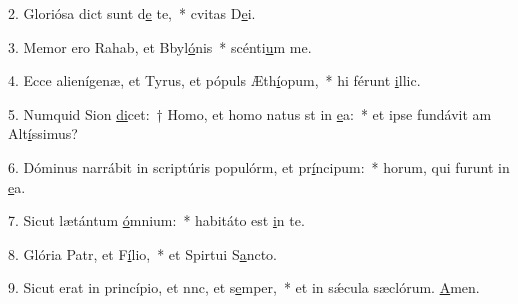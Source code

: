 2. Gloriósa dict sunt d\uline{e} te,~* cvitas D\uline{e}i.\par 
3. Memor ero Rahab, et Bbyl\uline{ó}nis~* scénti\uline{u}m me.\par 
4. Ecce alienígenæ, et Tyrus, et pópuls Æth\uline{í}opum,~* hi férunt \uline{i}llic.\par 
5. Numquid Sion \uline{di}cet:~† Homo, et homo natus st in \uline{e}a:~* et ipse fundávit am Alt\uline{í}ssimus?\par 
6. Dóminus narrábit in scriptúris populórm, et pr\uline{í}ncipum:~* horum, qui furunt in \uline{e}a.\par 
7. Sicut lætántum \uline{ó}mnium:~* habitáto est \uline{i}n te.\par 
8. Glória Patr, et F\uline{í}lio,~* et Spirtui S\uline{a}ncto.\par 
9. Sicut erat in princípio, et nnc, et s\uline{e}mper,~* et in sǽcula sæclórum. \uline{A}men.\par 
